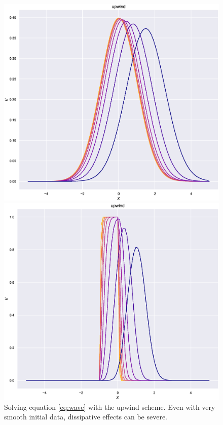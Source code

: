 \begin{figure}
    \centering
    \begin{minipage}[b]{0.49\textwidth}
        \centering
        \includegraphics[width=\textwidth]{Figures/advgaussian.eps}
    \end{minipage} %
    \begin{minipage}[b]{0.49\textwidth}
        \centering
        \includegraphics[width=\textwidth]{Figures/advindicator.eps}
    \end{minipage} %
    \caption{Solving equation \eqref{eq:wave} with the upwind scheme. Even with very smooth initial data, dissipative effects can be severe.} 
    \label{fig:advection}
\end{figure}
